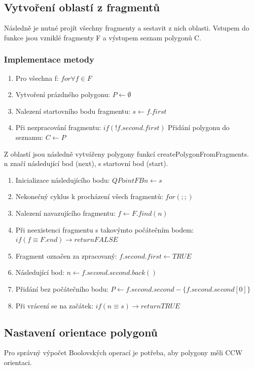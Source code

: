 \documentclass[a4paper, 12pt]{article}
\begin{document}
\subsection{Vytvoření oblastí z fragmentů}
Následně je nutné projít všechny fragmenty a sestavit z nich oblasti. Vstupem do funkce jsou vzniklé fragmenty F a výstupem seznam polygonů C.

\subsubsection{Implementace metody}
\begin{enumerate}
\item Pro všechna f: $ for \forall f \in F$
\item Vytvoření prázdného polygonu: $P \leftarrow \emptyset$
\item Nalezení startovního bodu fragmentu: $s \leftarrow f.first$
\item Při nezpracování fragmentu: $if (!f.second.first)$
\subitem Přidání polygonu do seznamu: $C \leftarrow P$
\end{enumerate}

Z oblastí jsou následně vytvářeny polygony funkcí createPolygonFromFragments. n značí následující bod (next), s startovní bod (start). 

\begin{enumerate}
\item Inicializace následujícího bodu: $QPointFB n \leftarrow s$
\item Nekonečný cyklus k procházení všech fragmentů: $for(;;)$
\item Nalezení navazujícího fragmentu: $f \leftarrow F.find(n)$
\item Při neexistenci fragmentu s takovýmto počátečním bodem: $if(f \equiv F.end) \rightarrow return FALSE$
\item Fragment označen za zpracovaný: $f.second.first \leftarrow TRUE$
\item Následující bod: $n \leftarrow f.second.second.back()$
\item Přidání bez počátečního bodu: $P \leftarrow f.second.second - \{ f.second.second[0]\} $
\item Při vrácení se na začátek: $if (n \equiv s) \rightarrow return TRUE$
\end{enumerate}

\subsection{Nastavení orientace polygonů}
Pro správný výpočet Boolovských operací je potřeba, aby polygony měli CCW orientaci.
\end{document}
